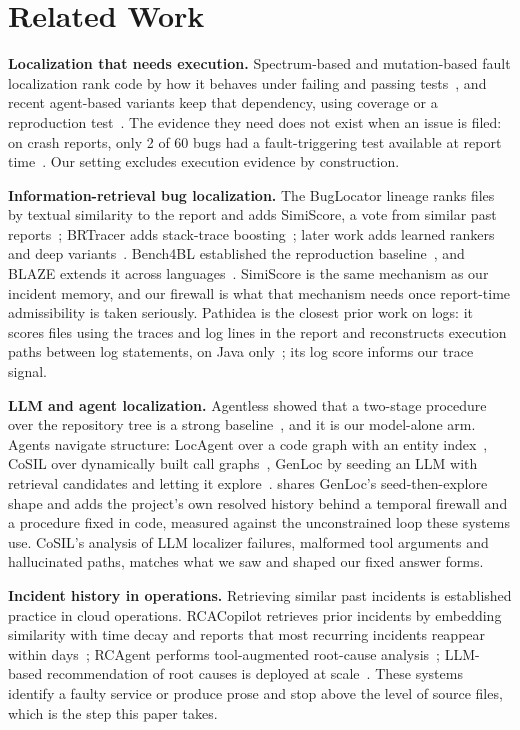 \section{Related Work}
\label{sec:related}

\textbf{Localization that needs execution.} Spectrum-based and
mutation-based fault localization rank code by how it behaves under
failing and passing tests~\cite{wong2016survey}, and recent
agent-based variants keep that dependency, using coverage or a
reproduction test~\cite{rafi2024multiagent,yu2025orcaloca}. The
evidence they need does not exist when an issue is filed: on crash
reports, only 2 of 60 bugs had a fault-triggering test available at
report time~\cite{rafi2025sbest}. Our setting excludes execution
evidence by construction.

\textbf{Information-retrieval bug localization.} The BugLocator lineage
ranks files by textual similarity to the report and adds SimiScore, a
vote from similar past reports~\cite{zhou2012buglocator}; BRTracer adds
stack-trace boosting~\cite{wong2014brtracer}; later work adds learned
rankers~\cite{ye2014learning} and deep variants~\cite{niu2025deepirbl}.
Bench4BL established the reproduction baseline~\cite{lee2018bench4bl},
and BLAZE extends it across languages~\cite{chakraborty2025blaze}.
SimiScore is the same mechanism as our incident memory, and our
firewall is what that mechanism needs once report-time admissibility
is taken seriously. Pathidea is the closest prior work on logs: it
scores files using the traces and log lines in the report and
reconstructs execution paths between log statements, on Java
only~\cite{chen2022pathidea}; its log score informs our trace signal.

\textbf{LLM and agent localization.} Agentless showed that a two-stage
procedure over the repository tree is a strong
baseline~\cite{xia2025agentless}, and it is our model-alone arm. Agents
navigate structure: LocAgent over a code graph with an entity
index~\cite{chen2025locagent}, CoSIL over dynamically built call
graphs~\cite{jiang2025cosil}, GenLoc by seeding an LLM with retrieval
candidates and letting it explore~\cite{asad2026genloc}. \sys{} shares
GenLoc's seed-then-explore shape and adds the project's own resolved
history behind a temporal firewall and a procedure fixed in code,
measured against the unconstrained loop these systems use. CoSIL's
analysis of LLM localizer failures, malformed tool arguments and
hallucinated paths, matches what we saw and shaped our fixed answer
forms.

\textbf{Incident history in operations.} Retrieving similar past
incidents is established practice in cloud operations. RCACopilot
retrieves prior incidents by embedding similarity with time decay and
reports that most recurring incidents reappear within
days~\cite{chen2024rcacopilot}; RCAgent performs tool-augmented
root-cause analysis~\cite{wang2024rcagent}; LLM-based recommendation
of root causes is deployed at scale~\cite{ahmed2023rootcause}. These
systems identify a faulty service or produce prose and stop above the
level of source files, which is the step this paper takes.

